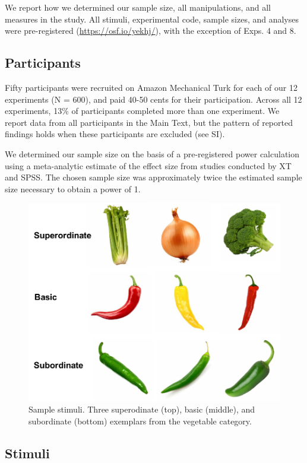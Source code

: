 \documentclass[english,floatsintext,man]{apa6}
\theoremstyle{definition}
\theoremstyle{definition}
\theoremstyle{remark}
\begin{document}
We report how we determined our sample size, all manipulations, and all
measures in the study. All stimuli, experimental code, sample sizes, and
analyses were pre-registered (\url{https://osf.io/yekhj/}), with the
exception of Exps. 4 and 8.

\subsection{Participants}\label{participants}

Fifty participants were recruited on Amazon Mechanical Turk for each of
our 12 experiments (N = 600), and paid 40-50 cents for their
participation. Across all 12 experiments, 13\% of participants completed
more than one experiment. We report data from all participants in the
Main Text, but the pattern of reported findings holds when these
participants are excluded (see SI).

We determined our sample size on the basis of a pre-registered power
calculation using a meta-analytic estimate of the effect size from
studies conducted by XT and SPSS. The chosen sample size was
approximately twice the estimated sample size necessary to obtain a
power of 1.

\begin{figure}[t!]
 
 {\centering \includegraphics[width=0.5\linewidth]{figs/stim} 
 
 }
 
 \caption{Sample stimuli. Three superodinate (top), basic (middle), and subordinate (bottom) exemplars from the vegetable category.}\label{fig:unnamed-chunk-1}
 \end{figure}

\subsection{Stimuli}\label{stimuli}
\end{document}
